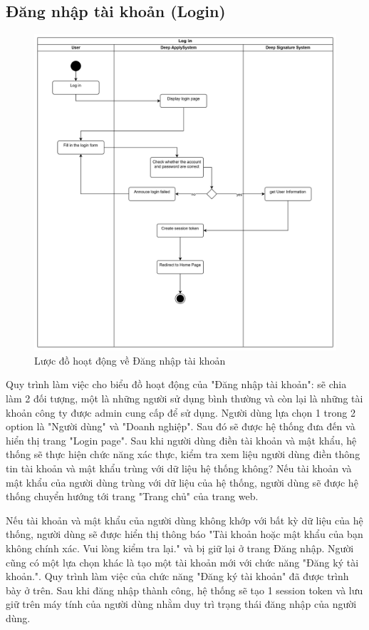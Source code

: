 \subsection{Đăng nhập tài khoản (Login)}

\begin{figure}[H]

	\centering
    \includegraphics[scale=0.08]{img/Login_workflow.png}
    \caption{Lược đồ hoạt động về Đăng nhập tài khoản}
\end{figure}

Quy trình làm việc cho biểu đồ hoạt động của "Đăng nhập tài khoản": sẽ chia làm 2 đối tượng, một là những người sử dụng bình thường và còn lại là những tài khoản công ty được admin cung cấp để sử dụng. Người dùng lựa chọn 1 trong 2 option là "Người dùng" và "Doanh nghiệp". Sau đó sẽ được hệ thống đưa đến và hiển thị trang "Login page". Sau khi người dùng điền tài khoản và mật khẩu, hệ thống sẽ thực hiện chức năng xác thực, kiểm tra xem liệu người dùng điền thông tin tài khoản và mật khẩu trùng với dữ liệu hệ thống không? Nếu tài khoản và mật khẩu của người dùng trùng với dữ liệu của hệ thống, người dùng sẽ được hệ thống chuyển hướng tới trang "Trang chủ" của trang web.

Nếu tài khoản và mật khẩu của người dùng không khớp với bất kỳ dữ liệu của hệ thống, người dùng sẽ được hiển thị thông báo "Tài khoản hoặc mật khẩu của bạn không chính xác. Vui lòng kiểm tra lại." và bị giữ lại ở trang Đăng nhập. Người cũng có một lựa chọn khác là tạo một tài khoản mới với chức năng "Đăng ký tài khoản.". Quy trình làm việc của chức năng "Đăng ký tài khoản" đã được trình bày ở trên. Sau khi đăng nhập thành công, hệ thống sẽ tạo 1 session token và lưu giữ trên máy tính của người dùng nhằm duy trì trạng thái đăng nhập của người dùng.

